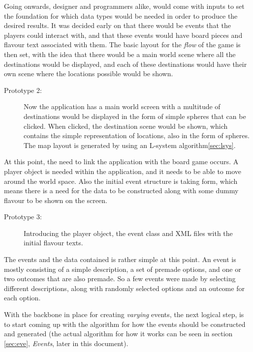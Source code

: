Going onwards, designer and programmers alike, would come with inputs to set the foundation for which data types would be needed in order to produce the desired results.
It was decided early on that there would be events that the players could interact with, and that these events would have board pieces and flavour text associated with them. The basic layout for the \textit{flow} of the game is then set, with the idea that there would be a main world scene where all the destinations would be displayed, and each of these destinations would have their own scene where the locations possible would be shown.

\begin{description}
\item[Prototype 2:] Now the application has a main world screen with a multitude of destinations would be displayed in the form of simple spheres that can be clicked. When clicked, the destination scene would be shown, which contains the simple representation of locations, also in the form of spheres.
The map layout is generated by using an L-system algorithm\ref{sec:lsys}.
\end{description}

At this point, the need to link the application with the board game occurs. A player object is needed within the application, and it needs to be able to move around the world space. Also the initial event structure is taking form, which means there is a need for the data to be constructed along with some dummy flavour to be shown on the screen.

\begin{description}
\item[Prototype 3:] Introducing the player object, the event class and XML files with the initial flavour texts.
\end{description}

The events and the data contained is rather simple at this point. An event is mostly consisting of a simple description, a set of premade options, and one or two outcomes that are also premade. So a few events were made by selecting different descriptions, along with randomly selected options and an outcome for each option.

With the backbone in place for creating \textit{varying} events, the next logical step, is to start coming up with the algorithm for how the events should be constructed and generated (the actual algorithm for how it works can be seen in section \ref{sec:eve}, \textit{Events}, later in this document).

